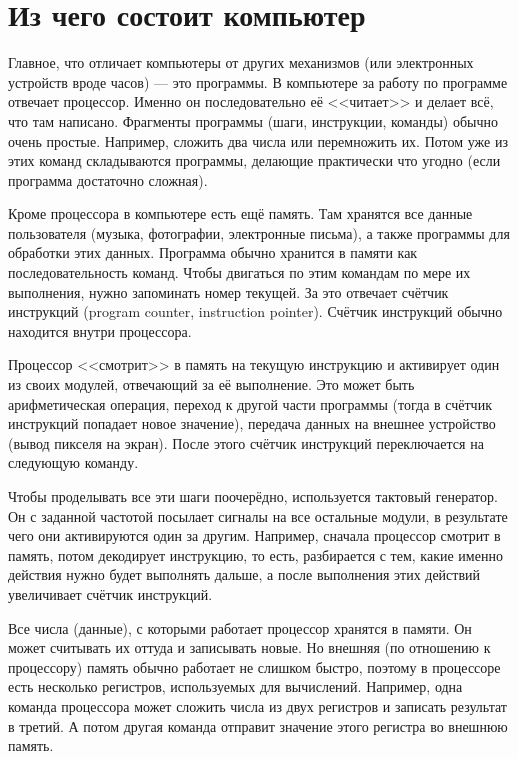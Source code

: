 \section*{Из чего состоит компьютер}


Главное, что отличает компьютеры от других механизмов (или электронных устройств вроде часов) ---
это программы. В компьютере за работу по программе отвечает процессор.
Именно он последовательно её <<читает>> и делает всё, что там написано.
Фрагменты программы (шаги, инструкции, команды) обычно очень простые. Например, сложить два числа
или перемножить их. Потом уже из этих команд складываются программы, делающие практически что угодно
(если программа достаточно сложная).

Кроме процессора в компьютере есть ещё память. Там хранятся все данные пользователя
(музыка, фотографии, электронные письма), а также программы для обработки этих данных.
Программа обычно хранится в памяти как последовательность команд. Чтобы двигаться по этим командам по мере их выполнения,
нужно запоминать номер текущей. За это отвечает счётчик инструкций (program counter, instruction pointer).
Счётчик инструкций обычно находится внутри процессора.

Процессор <<смотрит>> в память на текущую инструкцию и активирует один из своих модулей, отвечающий за её выполнение.
Это может быть арифметическая операция, переход к другой части программы (тогда в счётчик инструкций попадает новое значение),
передача данных на внешнее устройство (вывод пикселя на экран). После этого счётчик инструкций переключается на следующую
команду.

Чтобы проделывать все эти шаги поочерёдно, используется тактовый генератор. Он с заданной частотой посылает
сигналы на все остальные модули, в результате чего они активируются один за другим. Например, сначала
процессор смотрит в память, потом декодирует инструкцию, то есть, разбирается с тем,
какие именно действия нужно будет выполнять дальше, а после выполнения этих действий
увеличивает счётчик инструкций.

Все числа (данные), с которыми работает процессор хранятся в памяти. Он может считывать их оттуда и записывать новые.
Но внешняя (по отношению к процессору) память обычно работает не слишком быстро, поэтому в процессоре есть несколько
регистров, используемых для вычислений. Например, одна команда процессора может сложить числа из двух регистров и записать результат
в третий. А потом другая команда отправит значение этого регистра во внешнюю память.

